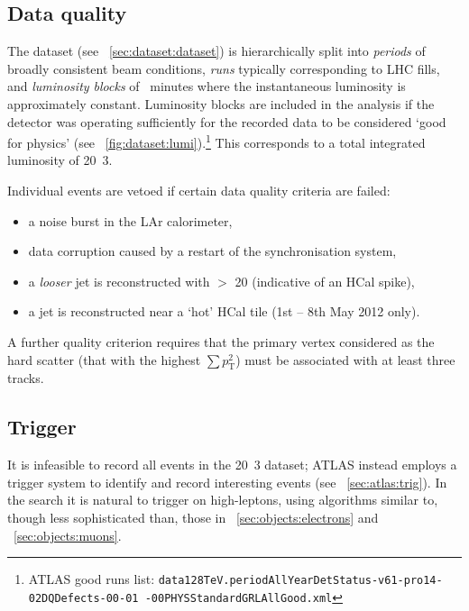 
\subsection{Data quality}
\label{sec:selection:quality}

The \pp dataset (see \Section~\ref{sec:dataset:dataset}) is hierarchically split into 
\textit{periods} of broadly consistent beam conditions, \textit{runs} typically 
corresponding to LHC fills, and \textit{luminosity blocks} of ~minutes where the 
instantaneous luminosity is approximately constant. Luminosity blocks are included in the 
analysis if the detector was operating sufficiently for the recorded data to be 
considered `good for physics' (see \Figure~\ref{fig:dataset:lumi}).\footnote{
	ATLAS good runs list: \texttt{data128TeV.periodAllYearDetStatus-v61-pro14-02DQDefects-00-01
	-00PHYSStandardGRLAllGood.xml}
} 
This corresponds to a total integrated luminosity of \unit{20.3}{\invfb}.

Individual events are vetoed if certain data quality criteria are failed:
\begin{itemize}[noitemsep,nolistsep]
	\item a noise burst in the LAr calorimeter,
	\item data corruption caused by a restart of the synchronisation system,
	\item a \textit{looser} jet is reconstructed with \pt $>$ \unit{20}{\GeV} (indicative of an HCal spike),
	\item a jet is reconstructed near a `hot' HCal tile (1st -- 8th May 2012 only).
\end{itemize}
A further quality criterion requires that the primary vertex considered as the hard 
scatter (that with the highest $\sum p_{\text{T}}^2$) must be associated with at least 
three tracks.



\subsection{Trigger}
\label{sec:selection:trigger}

It is infeasible to record all events in the \unit{20.3}{\invfb} dataset; ATLAS instead 
employs a trigger system to identify and record interesting events (see 
\Section~\ref{sec:atlas:trig}). In the \HWWlvlv search it is natural to trigger on 
high-\pt leptons, using algorithms similar to, though less sophisticated than, those in 
\Section~\ref{sec:objects:electrons} and \Section~\ref{sec:objects:muons}.

